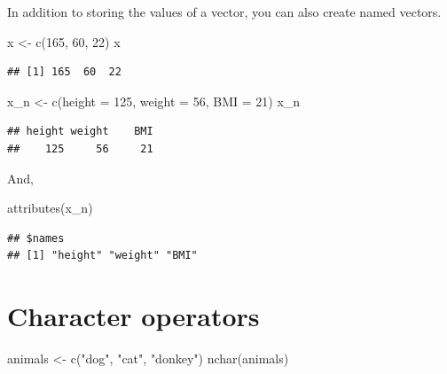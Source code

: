\documentclass[
]{book}
\newenvironment{Shaded}{\begin{snugshade}}{\end{snugshade}}
\newcommand{\AttributeTok}[1]{\textcolor[rgb]{0.77,0.63,0.00}{#1}}
\newcommand{\DecValTok}[1]{\textcolor[rgb]{0.00,0.00,0.81}{#1}}
\newcommand{\FunctionTok}[1]{\textcolor[rgb]{0.00,0.00,0.00}{#1}}
\newcommand{\NormalTok}[1]{#1}
\newcommand{\OtherTok}[1]{\textcolor[rgb]{0.56,0.35,0.01}{#1}}
\newcommand{\StringTok}[1]{\textcolor[rgb]{0.31,0.60,0.02}{#1}}
\begin{document}
In addition to storing the values of a vector, you can also create named vectors.

\begin{Shaded}
\begin{Highlighting}[]
\NormalTok{x }\OtherTok{\textless{}{-}} \FunctionTok{c}\NormalTok{(}\DecValTok{165}\NormalTok{, }\DecValTok{60}\NormalTok{, }\DecValTok{22}\NormalTok{)}
\NormalTok{x}
\end{Highlighting}
\end{Shaded}

\begin{verbatim}
## [1] 165  60  22
\end{verbatim}

\begin{Shaded}
\begin{Highlighting}[]
\NormalTok{x\_n }\OtherTok{\textless{}{-}} \FunctionTok{c}\NormalTok{(}\AttributeTok{height =} \DecValTok{125}\NormalTok{, }\AttributeTok{weight =} \DecValTok{56}\NormalTok{, }\AttributeTok{BMI =} \DecValTok{21}\NormalTok{)}
\NormalTok{x\_n}
\end{Highlighting}
\end{Shaded}

\begin{verbatim}
## height weight    BMI 
##    125     56     21
\end{verbatim}

And,

\begin{Shaded}
\begin{Highlighting}[]
\FunctionTok{attributes}\NormalTok{(x\_n)}
\end{Highlighting}
\end{Shaded}

\begin{verbatim}
## $names
## [1] "height" "weight" "BMI"
\end{verbatim}

\hypertarget{character-operators}{%
\section{Character operators}\label{character-operators}}

\begin{Shaded}
\begin{Highlighting}[]
\NormalTok{animals }\OtherTok{\textless{}{-}} \FunctionTok{c}\NormalTok{(}\StringTok{"dog"}\NormalTok{, }\StringTok{"cat"}\NormalTok{, }\StringTok{"donkey"}\NormalTok{)}
\FunctionTok{nchar}\NormalTok{(animals)}
\end{Highlighting}
\end{Shaded}
\end{document}
